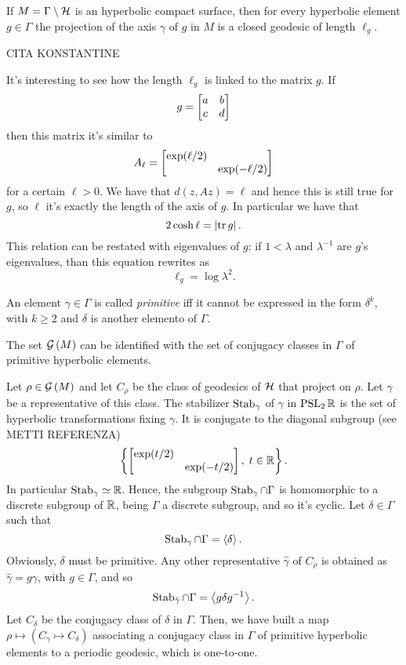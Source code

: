 \begin{nlem}
If $M=\Gamma\setminus\mathcal{H}$ is an hyperbolic compact surface, then for every hyperbolic element $g\in\Gamma$ the projection of the axis $\gamma$ of $g$ in $M$ is a closed geodesic of length $\ell_{g}$.
\end{nlem} 
\begin{prf}
CITA KONSTANTINE
\end{prf}

It's interesting to see how the length $\ell_{g}$ is linked to the matrix $g$. If 
\[
g=\begin{bmatrix} 
a&b\\c&d
 \end{bmatrix}
\]
then this matrix it's similar to 
\[
A_{\ell}=\begin{bmatrix} \exp(\ell/2)&\\&\exp(-\ell/2) \end{bmatrix}
\]
for a certain $\ell>0$. We have that $d(z,Az)=\ell$ and hence this is still true for $g$, so $\ell$ it's exactly the length of the axis of $g$. In particular we have that
\[
2\cosh\ell=\left| \operatorname{tr} g\right|.
\]
This relation can be restated with eigenvalues of $g$: if $1<\lambda$ and $\lambda^{-1}$ are $g$'s eigenvalues, than this equation rewrites as
\[
\ell_{g}=\log\lambda^{2}.
\]

\begin{defin}
\label{def:prim_elem}
An element $\gamma\in\Gamma$ is called \emph{primitive} iff it cannot be expressed in the form $\delta^{k}$, with $k\geq2$ and $\delta$ is another elemento of $\Gamma$.  
\end{defin}

\begin{nprop}
\label{prop:hyp_elements_classes}
The set $\mathcal{G}\left(M\right)$ can be identified with the set of conjugacy classes in $\Gamma$ of primitive hyperbolic elements.
\end{nprop}
\begin{prf}
Let $\rho\in\mathcal{G}\left(M\right)$ and let $C_{\rho}$ be the class of geodesics of $\mathcal{H}$ that project on $\rho$. Let $\gamma$ be a representative of this class. The stabilizer $\operatorname{Stab}_{\gamma}$ of $\gamma$ in $\operatorname{PSL}_{2}\mathbb{R}$ is the set of hyperbolic transformations fixing $\gamma$. It is conjugate to the diagonal subgroup (see METTI REFERENZA)
\[
\left\{
\begin{bmatrix} \exp(t/2)&\\&\exp(-t/2) \end{bmatrix},\; t\in\mathbb{R}
\right\}.
\]
In particular $\operatorname{Stab}_{\gamma}\simeq\mathbb{R}$. Hence, the subgroup $\operatorname{Stab}_{\gamma}\cap\Gamma$ is homomorphic to a discrete subgroup of $\mathbb{R}$, being $\Gamma$ a discrete subgroup, and so it's cyclic. Let $\delta\in\Gamma$ such that 
\[
\operatorname{Stab}_{\gamma}\cap\Gamma=\left< \delta\right>.
\]
Obviously, $\delta$ must be primitive. Any other representative $\hat{\gamma}$ of $C_{\rho}$ is obtained as $\hat{\gamma}=g\gamma$, with $g\in\Gamma$, and so 
\[
\operatorname{Stab}_{\hat{\gamma}}\cap\Gamma=\left< g\delta g^{-1}\right>.
\]
Let $C_{\delta}$ be the conjugacy class of $\delta$ in $\Gamma$. Then, we have built a map $\rho\mapsto(C_{\gamma}\mapsto C_{\delta})$ associating a conjugacy class in $\Gamma$ of primitive hyperbolic elements to a periodic geodesic, which is one-to-one.
\end{prf}


